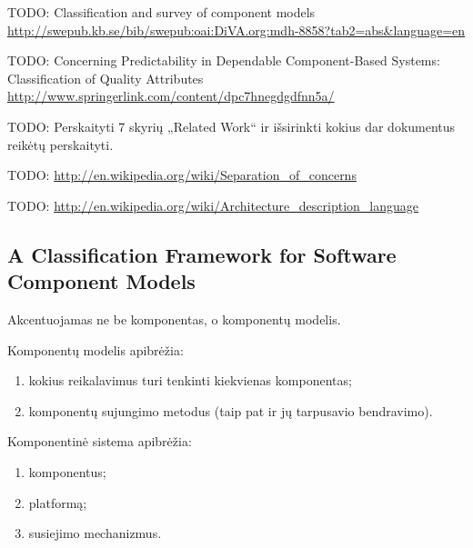 TODO: Classification and survey of component models
\url{http://swepub.kb.se/bib/swepub:oai:DiVA.org:mdh-8858?tab2=abs&language=en}

TODO: Concerning Predictability in Dependable Component-Based Systems: Classification of Quality Attributes 
\url{http://www.springerlink.com/content/dpc7hnegdgdfnn5a/}

TODO: Perskaityti \cite[18]{classification-framework-for-scm} 7 skyrių
„Related Work“ ir išsirinkti kokius dar dokumentus reikėtų perskaityti.

TODO: \url{http://en.wikipedia.org/wiki/Separation_of_concerns}

TODO: \url{http://en.wikipedia.org/wiki/Architecture_description_language}

\subsection{A Classification Framework for Software Component Models}

Akcentuojamas ne be komponentas, o komponentų modelis.

\begin{defn}
  Komponentų modelis apibrėžia:
  \begin{enumerate}
    \item kokius reikalavimus turi tenkinti kiekvienas komponentas;
    \item komponentų sujungimo metodus (taip pat ir jų tarpusavio
      bendravimo).
  \end{enumerate}
  \cite[2]{classification-framework-for-scm}
\end{defn}

\begin{defn}
  Komponentinė sistema apibrėžia:
  \begin{enumerate}
    \item komponentus;
    \item platformą;
    \item susiejimo mechanizmus.
  \end{enumerate}
  \cite[2]{classification-framework-for-scm}
\end{defn}
